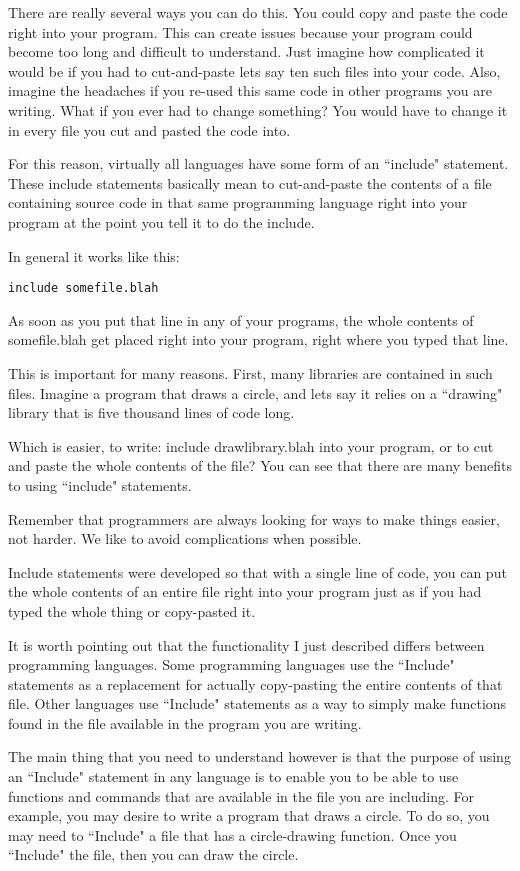\documentclass[a4paper,12pt]{article}
\begin{document}
There are really several ways you can do this. You could copy and paste the code right into your program. This can create issues because your program could become too long and difficult to understand. Just imagine how complicated it would be if you had to cut-and-paste lets say ten such files into your code. Also, imagine the headaches if you re-used this same code in other programs you are writing. What if you ever had to change something? You would have to change it in every file you cut and pasted the code into.

For this reason, virtually all languages have some form of an ``include" statement. These include statements basically mean to cut-and-paste the contents of a file containing source code in that same programming language right into your program at the point you tell it to do the include.

In general it works like this:
\begin{lstlisting}
include somefile.blah
\end{lstlisting}
As soon as you put that line in any of your programs, the whole contents of somefile.blah get placed right into your program, right where you typed that line.

This is important for many reasons. First, many libraries are contained in such files. Imagine a program that draws a circle, and lets say it relies on a ``drawing" library that is five thousand lines of code long.

Which is easier, to write: include drawlibrary.blah into your program, or to cut and paste the whole contents of the file? You can see that there are many benefits to using ``include" statements.

Remember that programmers are always looking for ways to make things easier, not harder. We like to avoid complications when possible.

Include statements were developed so that with a single line of code, you can put the whole contents of an entire file right into your program just as if you had typed the whole thing or copy-pasted it.

It is worth pointing out that the functionality I just described differs between programming languages. Some programming languages use the ``Include" statements as a replacement for actually copy-pasting the entire contents of that file. Other languages use ``Include" statements as a way to simply make functions found in the file available in the program you are writing.

The main thing that you need to understand however is that the purpose of using an ``Include" statement in any language is to enable you to be able to use functions and commands that are available in the file you are including. For example, you may desire to write a program that draws a circle. To do so, you may need to ``Include" a file that has a circle-drawing function. Once you ``Include" the file, then you can draw the circle.
\end{document}

